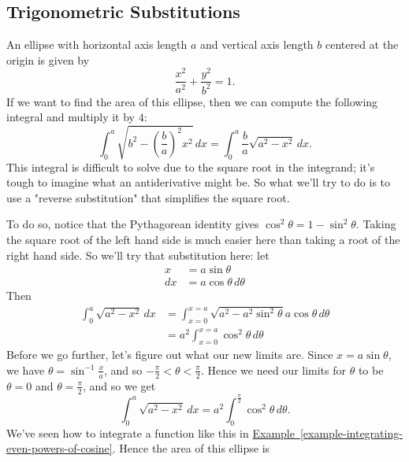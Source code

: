 \documentclass[10pt,]{book}
\numberwithin{equation}{section}
\newcommand{\lt}{<}
\begin{document}
\subsection[{Trigonometric Substitutions}]{Trigonometric Substitutions}\label{subsection-trigonometric-substitutions}
\hypertarget{p-542}{}%
An ellipse with horizontal axis length \(a\) and vertical axis length \(b\) centered at the origin is given by%
\begin{equation*}
\frac{x^{2}}{a^{2}} + \frac{y^{2}}{b^{2}} = 1.
\end{equation*}
If we want to find the area of this ellipse, then we can compute the following integral and multiply it by \(4\):%
\begin{equation*}
\int_{0}^{a}\sqrt{b^{2} - (\frac{b}{a})^{2}x^{2}}\,dx = \int_{0}^{a}\frac{b}{a}\sqrt{a^{2} - x^{2}}\,dx.
\end{equation*}
This integral is difficult to solve due to the square root in the integrand; it's tough to imagine what an antiderivative might be. So what we'll try to do is to use a "reverse substitution" that simplifies the square root.%
\par
\hypertarget{p-543}{}%
To do so, notice that the Pythagorean identity gives \(\cos^{2}\theta = 1 - \sin^{2}\theta\). Taking the square root of the left hand side is much easier here than taking a root of the right hand side. So we'll try that substitution here: let%
\begin{align*}
x & = a\sin\theta \\
dx & = a\cos\theta\,d\theta 
\end{align*}
Then%
\begin{align*}
\int_{0}^{a}\sqrt{a^{2} - x^{2}}\,dx & = \int_{x = 0}^{x = a}\sqrt{a^{2} - a^{2}\sin^{2}\theta}a\cos\theta\,d\theta \\
& = a^{2}\int_{x = 0}^{x = a}\cos^{2}\theta\,d\theta 
\end{align*}
Before we go further, let's figure out what our new limits are. Since \(x = a\sin\theta\), we have \(\theta = \sin^{-1}\frac{x}{a}\), and so \(-\frac{\pi}{2} \lt \theta \lt \frac{\pi}{2}\). Hence we need our limits for \(\theta\) to be \(\theta = 0\) and \(\theta = \frac{\pi}{2}\), and so we get%
\begin{equation*}
\int_{0}^{a}\sqrt{a^{2} - x^{2}}\,dx = a^{2}\int_{0}^{\frac{\pi}{2}}\cos^{2}\theta\,d\theta.
\end{equation*}
We've seen how to integrate a function like this in \hyperref[example-integrating-even-powers-of-cosine]{Example~\ref{example-integrating-even-powers-of-cosine}}. Hence the area of this ellipse is%
\end{document}
